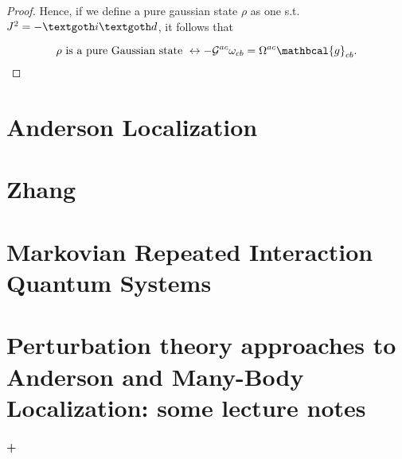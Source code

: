 \documentclass{homework}
\begin{document}
\begin{itemize}
\begin{proof}
    Hence, if we define a pure gaussian state $\rho$ as one s.t. $J^2 = -\id$, it follows that 

    \begin{equation*}
        \textnormal{$\rho$ is a pure Gaussian state } \leftrightarrow -\mathcal{G}^{ac} \omega_{cb} = \Omega^{ac} \mathbcal{g}_{cb}.
    \end{equation*}
    \end{proof}
    
\end{itemize}


\section{Anderson Localization}

\section{Zhang}

\section{Markovian Repeated Interaction Quantum Systems}

\section{Perturbation theory approaches to Anderson and Many-Body Localization: some lecture notes
}

\paragraph{+}

\clearpage
\end{document}

